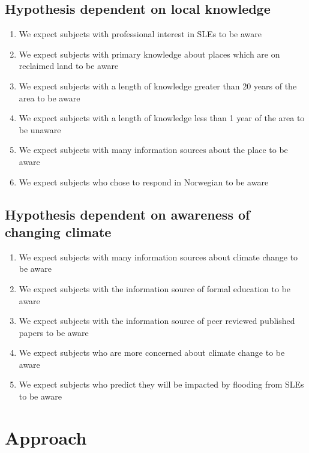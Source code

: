 \subsection{Hypothesis dependent on local knowledge}
\begin{enumerate}
    \item We expect subjects with professional interest in SLEs to be aware
    \item We expect subjects with primary knowledge about places which are on reclaimed land to be aware
    \item We expect subjects with a length of knowledge greater than 20 years of the area to be aware
    \item We expect subjects with a length of knowledge less than 1 year of the area to be unaware
    \item We expect subjects with many information sources about the place to be aware
    \item We expect subjects who chose to respond in Norwegian to be aware
\end{enumerate}
\paragraph{}

\subsection{Hypothesis dependent on awareness of changing climate}
\begin{enumerate}
    \item We expect subjects with many information sources about climate change to be aware
    \item We expect subjects with the information source of formal education to be aware
    \item We expect subjects with the information source of peer reviewed published papers to be aware
    \item We expect subjects who are more concerned about climate change to be aware
    \item We expect subjects who predict they will be impacted by flooding from SLEs to be aware
\end{enumerate}



\section{Approach}

